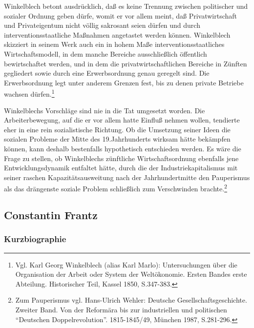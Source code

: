 \documentclass[a4paper,12pt]{article}
\begin{document}
Winkelblech betont ausdrücklich, daß es keine Trennung zwischen
politischer und sozialer Ordnung geben dürfe, womit er vor allem
meint, daß Privatwirtschaft und Privateigentum nicht völlig
sakrosant seien dürfen und durch interventionsstaatliche Maßnahmen
angetastet werden können. Winkelblech skizziert in seinem Werk auch
ein in hohem Maße interventionsstaatliches Wirtschaftsmodell, in
dem manche Bereiche ausschließlich öffentlich bewirtschaftet
werden, und in dem die privatwirtschaftlichen Bereiche in Zünften
gegliedert sowie durch eine Erwerbsordnung genau geregelt sind. Die
Erwerbsordnung legt unter anderem Grenzen fest, bis zu denen
private Betriebe wachsen dürfen.\footnote{Vgl. Karl Georg
Winkelblech (alias Karl Marlo)\cite{winkelblech}: Untersuchungen
über die Organisation der Arbeit oder System der
Weltökonomie. Ersten Bandes erste Abteilung. Historischer Teil,
Kassel 1850, S.347-383.}

Winkelblechs Vorschläge sind nie in die Tat umgesetzt worden. Die
Arbeiterbewegung, auf die er vor allem hatte Einfluß nehmen wollen,
tendierte eher in eine rein sozialistische Richtung. Ob die Umsetzung
seiner Ideen die sozialen Probleme der Mitte des 19.Jahrhunderts
wirksam hätte bekämpfen können, kann deshalb bestenfalls hypothetisch
entschieden werden. Es wäre die Frage zu stellen, ob Winkelblechs
zünftliche Wirtschaftsordnung ebenfalls jene Entwicklungsdynamik
entfaltet hätte, durch die der Industriekapitalismus mit seiner
raschen Kapazitätsausweitung nach der Jahrhundertmitte den Pauperismus
als das drängenste soziale Problem schließlich zum Verschwinden
brachte.\footnote{Zum Pauperismus vgl. Hans-Ulrich
Wehler\cite{wehler}: Deutsche Gesellschaftsgeschichte. Zweiter
Band. Von der Reformära bis zur industriellen und politischen
"`Deutschen Doppelrevolution"'. 1815-1845/49, München 1987,
S.281-296.}

\subsection{Constantin Frantz}

\subsubsection{Kurzbiographie}
\end{document}
